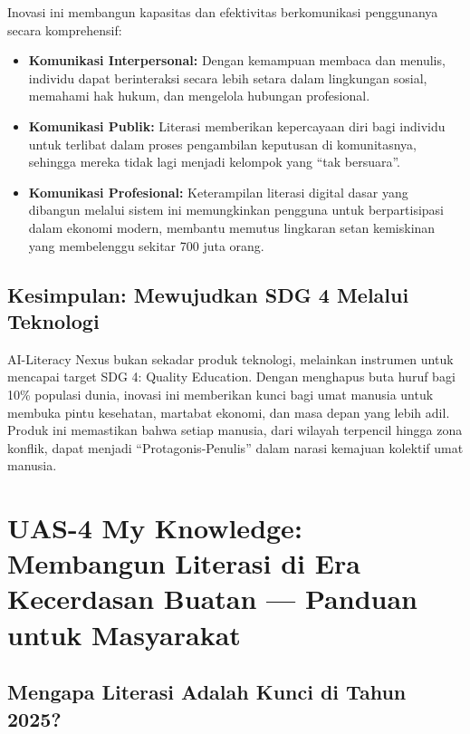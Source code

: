 \documentclass[
  letterpaper,
  DIV=11,
  numbers=noendperiod]{scrreprt}
\begin{document}
Inovasi ini membangun kapasitas dan efektivitas berkomunikasi
penggunanya secara komprehensif:

\begin{itemize}
\item
  \textbf{Komunikasi Interpersonal:} Dengan kemampuan membaca dan
  menulis, individu dapat berinteraksi secara lebih setara dalam
  lingkungan sosial, memahami hak hukum, dan mengelola hubungan
  profesional.
\item
  \textbf{Komunikasi Publik:} Literasi memberikan kepercayaan diri bagi
  individu untuk terlibat dalam proses pengambilan keputusan di
  komunitasnya, sehingga mereka tidak lagi menjadi kelompok yang ``tak
  bersuara''.
\item
  \textbf{Komunikasi Profesional:} Keterampilan literasi digital dasar
  yang dibangun melalui sistem ini memungkinkan pengguna untuk
  berpartisipasi dalam ekonomi modern, membantu memutus lingkaran setan
  kemiskinan yang membelenggu sekitar 700 juta orang.
\end{itemize}

\section{Kesimpulan: Mewujudkan SDG 4 Melalui
Teknologi}\label{kesimpulan-mewujudkan-sdg-4-melalui-teknologi}

AI-Literacy Nexus bukan sekadar produk teknologi, melainkan instrumen
untuk mencapai target SDG 4: Quality Education. Dengan menghapus buta
huruf bagi 10\% populasi dunia, inovasi ini memberikan kunci bagi umat
manusia untuk membuka pintu kesehatan, martabat ekonomi, dan masa depan
yang lebih adil. Produk ini memastikan bahwa setiap manusia, dari
wilayah terpencil hingga zona konflik, dapat menjadi
``Protagonis-Penulis'' dalam narasi kemajuan kolektif umat manusia.


\chapter{UAS-4 My Knowledge: Membangun Literasi di Era Kecerdasan Buatan
--- Panduan untuk
Masyarakat}\label{uas-4-my-knowledge-membangun-literasi-di-era-kecerdasan-buatan-panduan-untuk-masyarakat}

\section{Mengapa Literasi Adalah Kunci di Tahun
2025?}\label{mengapa-literasi-adalah-kunci-di-tahun-2025}
\end{document}
